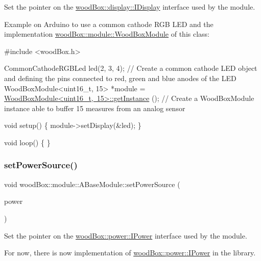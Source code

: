 Set the pointer on the \mbox{\hyperlink{classwood_box_1_1display_1_1_i_display}{wood\+Box\+::display\+::\+I\+Display}} interface used by the module.

Example on Arduino to use a common cathode R\+GB L\+ED and the implementation \mbox{\hyperlink{classwood_box_1_1module_1_1_wood_box_module}{wood\+Box\+::module\+::\+Wood\+Box\+Module}} of this class\+:


\begin{DoxyCode}
\textcolor{preprocessor}{#include <woodBox.h>}

CommonCathodeRGBLed led(2, 3, 4); \textcolor{comment}{// Create a common cathode LED object and defining the pins connected to
       red, green and blue anodes of the LED}
WoodBoxModule<uint16\_t, 15> *module = \mbox{\hyperlink{classwood_box_1_1module_1_1_wood_box_module_a3f13bd3a6318ddf2a7db84f86b198a49}{WoodBoxModule<uint16\_t, 15>::getInstance}}
      (); \textcolor{comment}{// Create a WoodBoxModule instance able to buffer 15 measures from an analog sensor}

\textcolor{keywordtype}{void} setup() \{
  module->setDisplay(&led);
\}

\textcolor{keywordtype}{void} loop() \{
\}
\end{DoxyCode}
 \mbox{\label{classwood_box_1_1module_1_1_a_base_module_a117ce9fbbcef048ccde38f0b6a11aa91}} 
\subsubsection{\texorpdfstring{set\+Power\+Source()}{setPowerSource()}}
{\footnotesize\ttfamily void wood\+Box\+::module\+::\+A\+Base\+Module\+::set\+Power\+Source (\begin{DoxyParamCaption}\item[{\mbox{\hyperlink{classwood_box_1_1power_1_1_i_power}{power\+::\+I\+Power}} $\ast$}]{power }\end{DoxyParamCaption})}

Set the pointer on the \mbox{\hyperlink{classwood_box_1_1power_1_1_i_power}{wood\+Box\+::power\+::\+I\+Power}} interface used by the module.

For now, there is now implementation of \mbox{\hyperlink{classwood_box_1_1power_1_1_i_power}{wood\+Box\+::power\+::\+I\+Power}} in the library. \mbox{\label{classwood_box_1_1module_1_1_a_base_module_ac3fd88feae532ca88b14642f76ef8def}} 
